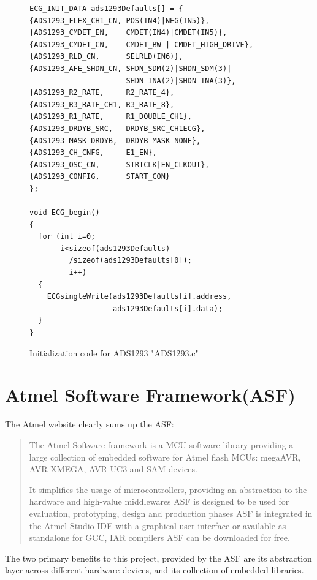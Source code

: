 \begin{figure}
	\begin{center}
		\label{fig:ADS1293_INIT}
\begin{lstlisting}[frame=single,morekeywords={ECG_INIT_DATA}]
ECG_INIT_DATA ads1293Defaults[] = {
{ADS1293_FLEX_CH1_CN, POS(IN4)|NEG(IN5)}, 
{ADS1293_CMDET_EN,    CMDET(IN4)|CMDET(IN5)},
{ADS1293_CMDET_CN,    CMDET_BW | CMDET_HIGH_DRIVE},
{ADS1293_RLD_CN,      SELRLD(IN6)},
{ADS1293_AFE_SHDN_CN, SHDN_SDM(2)|SHDN_SDM(3)|
                      SHDN_INA(2)|SHDN_INA(3)},
{ADS1293_R2_RATE,     R2_RATE_4},
{ADS1293_R3_RATE_CH1, R3_RATE_8},
{ADS1293_R1_RATE,     R1_DOUBLE_CH1},
{ADS1293_DRDYB_SRC,   DRDYB_SRC_CH1ECG},
{ADS1293_MASK_DRDYB,  DRDYB_MASK_NONE},
{ADS1293_CH_CNFG,     E1_EN},
{ADS1293_OSC_CN,      STRTCLK|EN_CLKOUT},
{ADS1293_CONFIG,      START_CON}
};

void ECG_begin()
{
  for (int i=0;
       i<sizeof(ads1293Defaults)
         /sizeof(ads1293Defaults[0]);
         i++)
  {
    ECGsingleWrite(ads1293Defaults[i].address,
                   ads1293Defaults[i].data);
  }
}
\end{lstlisting}
		\caption{Initialization code for ADS1293 "ADS1293.c"}
	\end{center}
\end{figure}



\section{Atmel Software Framework(ASF)}
The Atmel website clearly sums up the ASF:

\begin{quotation}
The Atmel Software framework is a MCU software library providing a large collection of embedded software for Atmel flash MCUs: megaAVR, AVR XMEGA, AVR UC3 and SAM devices.

It  simplifies the usage of microcontrollers, providing an abstraction to the hardware and high-value middlewares
ASF is designed to be used for evaluation, prototyping, design and production phases
ASF is integrated in the Atmel Studio IDE with a graphical user interface or available as standalone for GCC, IAR compilers
ASF can be downloaded for free. \cite{AtmelStudio}
\end{quotation} 

The two primary benefits to this project, provided by the ASF are its abstraction layer across different hardware devices, and its collection of embedded libraries.

